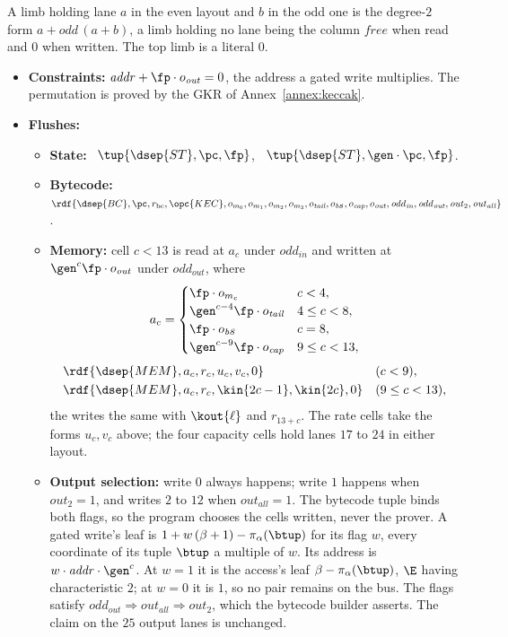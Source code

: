 A limb holding lane $a$ in the even layout and $b$ in the odd one is the degree-$2$ form $a+\mathit{odd}\,(a+b)$, a limb holding no lane being the column $\mathit{free}$ when read and $0$ when written. The top limb is a literal $0$.
\begin{itemize}
\item \textbf{Constraints:} $\mathit{addr}+\fp\cdot o_{\mathit{out}}=0$, the address a gated write multiplies. The permutation is proved by the GKR of Annex~\ref{annex:keccak}.
\item \textbf{Flushes:}
  \begin{itemize}
  \item \textbf{State:} \pull\ $\tup{\dsep{ST},\pc,\fp}$, \push\ $\tup{\dsep{ST},\gen\cdot\pc,\fp}$.
  \item \textbf{Bytecode:} $\rdf{\dsep{BC},\pc,r_{\mathrm{bc}},\opc{KEC},o_{m_0},o_{m_1},o_{m_2},o_{m_3},o_{\mathit{tail}},o_{\mathit{b8}},o_{\mathit{cap}},o_{\mathit{out}},\mathit{odd}_{\mathit{in}},\mathit{odd}_{\mathit{out}},\mathit{out}_2,\mathit{out}_{\mathit{all}}}$.
  \item \textbf{Memory:} cell $c<13$ is read at $a_c$ under $\mathit{odd}_{\mathit{in}}$ and written at $\gen^{c}\fp\cdot o_{\mathit{out}}$ under $\mathit{odd}_{\mathit{out}}$, where
    \[
      a_c=\begin{cases}
        \fp\cdot o_{m_c} & c<4,\\
        \gen^{c-4}\fp\cdot o_{\mathit{tail}} & 4\le c<8,\\
        \fp\cdot o_{\mathit{b8}} & c=8,\\
        \gen^{c-9}\fp\cdot o_{\mathit{cap}} & 9\le c<13,
      \end{cases}
    \]
    \begin{align*}
      &\rdf{\dsep{MEM},a_c,r_c,u_c,v_c,0} &&(c<9),\\
      &\rdf{\dsep{MEM},a_c,r_c,\kin{2c-1},\kin{2c},0} &&(9\le c<13),
    \end{align*}
    the writes the same with $\kout{\ell}$ and $r_{13+c}$. The rate cells take the forms $u_c,v_c$ above; the four capacity cells hold lanes $17$ to $24$ in either layout.
  \item \textbf{Output selection:} write $0$ always happens; write $1$ happens when $\mathit{out}_2=1$, and writes $2$ to $12$ when $\mathit{out}_{\mathit{all}}=1$. The bytecode tuple binds both flags, so the program chooses the cells written, never the prover. A gated write's leaf is $1+w\,(\beta+1)-\pi_\alpha(\btup)$ for its flag $w$, every coordinate of its tuple $\btup$ a multiple of $w$. Its address is $w\cdot\mathit{addr}\cdot\gen^{c}$. At $w=1$ it is the access's leaf $\beta-\pi_\alpha(\btup)$, $\E$ having characteristic $2$; at $w=0$ it is $1$, so no pair remains on the bus. The flags satisfy $\mathit{odd}_{\mathit{out}}\Rightarrow\mathit{out}_{\mathit{all}}\Rightarrow\mathit{out}_2$, which the bytecode builder asserts. The claim on the $25$ output lanes is unchanged.
  \end{itemize}
\end{itemize}
